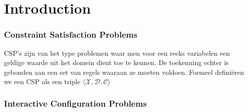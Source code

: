 \chapter{Introduction}
\label{cha:intro}

\subsection{Constraint Satisfaction Problems}
CSP's zijn van het type problemen waar men voor een reeks variabelen een geldige waarde uit het domein dient toe te kennen. De toekenning echter is gebonden aan een set van regels waaraan ze moeten voldoen. Formeel defini\"{e}ren we een CSP als een triple $\langle \mathcal{X},\mathcal{D},\mathcal{C} \rangle$

\subsection{Interactive Configuration Problems}

